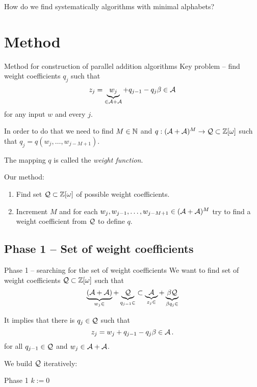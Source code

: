     
    
    How do we find systematically algorithms with minimal alphabets?  



\section{Method}

    {Method for construction of parallel addition algorithms}
    Key problem -- find weight coefficients $q_j$ such that 
    $$
        z_j=\underbrace{w_j}_{\in \mathcal{A} +\mathcal{A}} + q_{j-1} - q_j \beta \in \mathcal{A} 
    $$  
    for any input $w$ and every $j$.
    
    
    In order to do that we need to find $M \in \mathbb{N}$ and $q:(\mathcal{A}+\mathcal{A})^{M} \rightarrow \mathcal{Q} \subset \mathbb{Z}[\omega]$ such that $q_j=q(w_j, \dots, w_{j-M+1})$.
    
    The mapping $q$ is called the \textit{weight function}.%
    
    
    \vspace{20pt}
    Our method:
    \begin{enumerate}
        \item Find set $\mathcal{Q} \subset \mathbb{Z}[\omega]$ of possible weight coefficients.
        \item Increment $M$ and for each $w_j,w_{j-1}, \dots , w_{j-M+1} \in (\mathcal{A}+\mathcal{A})^{M}$ try to find a weight coefficient from $\mathcal{Q}$ to define $q$.
    \end{enumerate}


\subsection{Phase 1 -- Set of weight coefficients}

    {Phase 1 -- searching for the set of weight coefficients}
    We want to find set of weight coefficients $\mathcal{Q} \subset \mathbb{Z}[\omega]$ such that
    $$
    \underbrace{(\mathcal{A}+\mathcal{A})}_{w_j \in}+ \underbrace{\mathcal{Q}}_{q_{j-1} \in} \subset \underbrace{\mathcal{A}}_{z_j \in} + \underbrace{\beta \mathcal{Q}}_{\beta q_j \in}
    $$
    
    It implies that there is $q_j \in \mathcal{Q}$ such that
    $$
    z_j=w_j + q_{j-1} - q_j \beta \in \mathcal{A} \,.
    $$
    for all $q_{j-1} \in \mathcal{Q}$ and $w_j \in \mathcal{A}+\mathcal{A}$.




    We build $\mathcal{Q}$ iteratively:
    
    
    {Phase 1}
     $k:=0$
     
